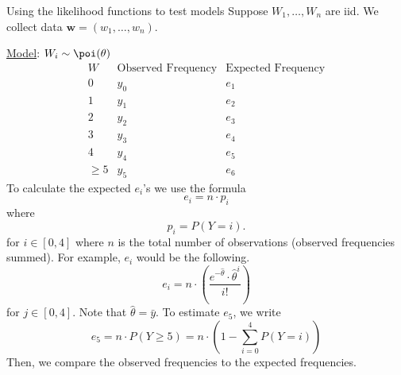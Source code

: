 \begin{Example}{Using the likelihood functions to test models}{}
    Suppose $ W_1,\ldots ,W_n $ are iid. We collect data $ \symbf{w}=(w_1,\ldots ,w_n) $.

    \underline{Model}: $ W_i \sim \poi(\theta) $
    \[
        \begin{array}{c|c|c|}
            W           & \text{Observed Frequency} & \text{Expected Frequency} \\
            \hline
            0           & y_0                       & e_1                       \\
            1           & y_1                       & e_2                       \\
            2           & y_2                       & e_3                       \\
            3           & y_3                       & e_4                       \\
            4           & y_4                       & e_5                       \\
            \geqslant 5 & y_5                       & e_6
        \end{array}
    \]
    To calculate the expected $ e_i $'s we use the formula
    \[ e_i=n\cdot p_i \]
    where
    \[ p_i=P(Y=i). \]
    for $ i\in[0,4] $ where $ n $ is the total number of observations (observed frequencies summed).
    For example, $ e_i $ would be the following.
    \[ e_i=n\cdot \left( \frac{e^{-\hat{\theta}}\cdot\hat{\theta}^{i}}{i!} \right) \]
    for $ j\in[0,4] $. Note that $ \hat{\theta}=\bar{y} $.
    To estimate $ e_5 $, we write
    \[ e_5=n\cdot P(Y\geqslant 5)=n\cdot \left( 1-\sum\limits_{i=0}^{4}P(Y=i) \right) \]
    Then, we compare the observed frequencies to the expected frequencies.
\end{Example}

